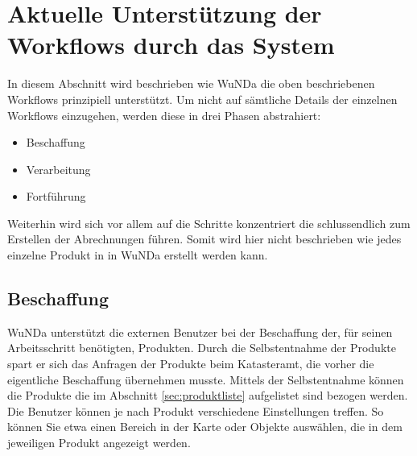 
\section{Aktuelle Unterstützung der Workflows durch das System}

In diesem Abschnitt wird beschrieben wie \ac{WuNDa} die oben beschriebenen Workflows prinzipiell unterstützt.
Um nicht auf sämtliche Details der einzelnen Workflows einzugehen, werden diese in drei Phasen abstrahiert:
\begin{itemize}
 \item Beschaffung
 \item Verarbeitung
 \item Fortführung
\end{itemize}
Weiterhin wird sich vor allem auf die Schritte konzentriert die schlussendlich zum Erstellen der Abrechnungen führen. Somit wird hier nicht beschrieben wie jedes einzelne Produkt in in \ac{WuNDa} erstellt werden kann.

\subsection{Beschaffung}
\ac{WuNDa} unterstützt die externen Benutzer bei der Beschaffung der, für seinen Arbeitsschritt benötigten, Produkten. Durch die Selbstentnahme der Produkte spart er sich das Anfragen der Produkte beim Katasteramt, die vorher die eigentliche Beschaffung übernehmen musste. Mittels der Selbstentnahme können die Produkte die im Abschnitt \ref{sec:produktliste} aufgelistet sind bezogen werden.
Die Benutzer können je nach Produkt verschiedene Einstellungen treffen. So können Sie etwa einen Bereich in der Karte oder Objekte auswählen, die in dem jeweiligen Produkt angezeigt werden.


